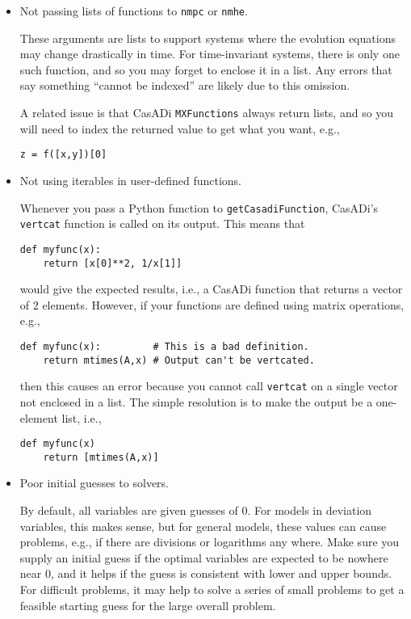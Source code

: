 \documentclass{article}
\newcommand{\casadi}{CasADi}
\begin{document}
\begin{itemize}
    \item Not passing lists of functions to \texttt{nmpc} or \texttt{nmhe}.
    
    These arguments are lists to support systems where the evolution equations may change drastically in time.
    For time-invariant systems, there is only one such function, and so you may forget to enclose it in a list.
    Any errors that say something ``cannot be indexed'' are likely due to this omission.
    
    A related issue is that \casadi{} \texttt{MXFunctions} always return lists, and so you will need to index the returned value to get what you want, e.g.,
\begin{lstlisting}[frame=L]
z = f([x,y])[0]
\end{lstlisting}
    
    \item Not using iterables in user-defined functions.
    
    Whenever you pass a Python function to \texttt{getCasadiFunction}, \casadi{}'s \texttt{vertcat} function is called on its output.
    This means that
\begin{lstlisting}[frame=L]
def myfunc(x):
    return [x[0]**2, 1/x[1]]
\end{lstlisting}
    would give the expected results, i.e., a \casadi{} function that returns a vector of 2 elements.
    However, if your functions are defined using matrix operations, e.g.,
\begin{lstlisting}[frame=L]
def myfunc(x):         # This is a bad definition.
    return mtimes(A,x) # Output can't be vertcated.
\end{lstlisting}
    then this causes an error because you cannot call \texttt{vertcat} on a single vector not enclosed in a list.
    The simple resolution is to make the output be a one-element list, i.e.,
\begin{lstlisting}[frame=L]
def myfunc(x)
    return [mtimes(A,x)]
\end{lstlisting}
    
    \item Poor initial guesses to solvers.
    
    By default, all variables are given guesses of 0.
    For models in deviation variables, this makes sense, but for general models, these values can cause problems, e.g., if there are divisions or logarithms any where.
    Make sure you supply an initial guess if the optimal variables are expected to be nowhere near 0, and it helps if the guess is consistent with lower and upper bounds.
    For difficult problems, it may help to solve a series of small problems to get a feasible starting guess for the large overall problem.
    

\end{itemize}
\end{document}
